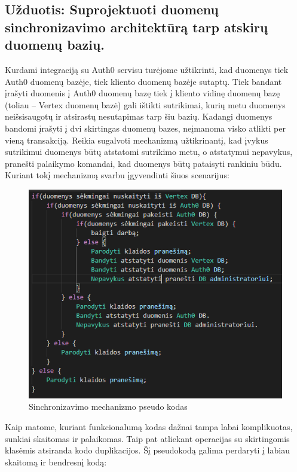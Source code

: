 \documentclass{VUMIFPSkursinis}
\begin{document}
	\subsection{Užduotis: Suprojektuoti duomenų sinchronizavimo architektūrą tarp atskirų duomenų bazių.}
		Kurdami integraciją su Auth0 servisu turėjome užtikrinti, kad duomenys tiek Auth0 duomenų bazėje, tiek kliento duomenų bazėje sutaptų.
		Tiek bandant įrašyti duomenis į Auth0 duomenų bazę tiek į kliento vidinę duomenų bazę (toliau – Vertex duomenų bazė) gali ištikti sutrikimai, kurių metu duomenys neišsisaugotų ir atsirastų nesutapimas tarp šiu bazių.
		Kadangi duomenys bandomi įrašyti į dvi skirtingas duomenų bazes, neįmanoma visko atlikti per vieną transakciją.
		Reikia sugalvoti mechanizmą užtikrinantį, kad įvykus sutrikimui duomenys būtų atstatomi sutrikimo metu, o atstatymui nepavykus, pranešti palaikymo komandai, kad duomenys būtų pataisyti rankiniu būdu. 
		Kuriant tokį mechanizmą svarbu įgyvendinti šiuos scenarijus:
			\begin{figure}[H]
			\includegraphics[scale=1]{img/five}
			\caption{Sinchronizavimo mechanizmo pseudo kodas} %
			\label{img:kurimoProcesas}
			\end{figure}
		Kaip matome, kuriant funkcionalumą kodas dažnai tampa labai komplikuotas, sunkiai skaitomas ir palaikomas.
		Taip pat atliekant operacijas su skirtingomis klasėmis atsiranda kodo duplikacijos.
		Šį pseudokodą galima perdaryti į labiau skaitomą ir bendresnį kodą:
\end{document}
